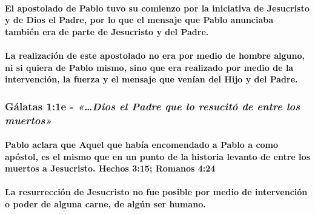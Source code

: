 \documentclass[11a pt,twoside]{article}
\newcommand{\scripture}[1]{%
  {\fontsize{12pt}{16pt}\selectfont\ScriptureFont\itshape #1}%
}
\let\oldsubsubsection\subsubsection
\renewcommand{\subsubsection}{\needspace{4\baselineskip}\oldsubsubsection}
\let\oldparagraph\paragraph
\renewcommand{\paragraph}{\needspace{3\baselineskip}\oldparagraph}
\begin{document}
\paragraph{El apostolado de Pablo tuvo su comienzo por la iniciativa de
Jesucristo y de Dios el Padre, por lo que el mensaje que Pablo anunciaba
también era de parte de Jesucristo y del
Padre.}\label{el-apostolado-de-pablo-tuvo-su-comienzo-por-la-iniciativa-de-jesucristo-y-de-dios-el-padre-por-lo-que-el-mensaje-que-pablo-anunciaba-tambiuxe9n-era-de-parte-de-jesucristo-y-del-padre.}

\paragraph{La realización de este apostolado no era por medio de hombre
alguno, ni si quiera de Pablo mismo, sino que era realizado por medio de
la intervención, la fuerza y el mensaje que venían del Hijo y del
Padre.}\label{la-realizaciuxf3n-de-este-apostolado-no-era-por-medio-de-hombre-alguno-ni-si-quiera-de-pablo-mismo-sino-que-era-realizado-por-medio-de-la-intervenciuxf3n-la-fuerza-y-el-mensaje-que-venuxedan-del-hijo-y-del-padre.}

\subsubsection{\texorpdfstring{Gálatas 1:1e -
\scripture{«…Dios el Padre que lo resucitó de entre los muertos»}}{Gálatas 1:1e - }}\label{guxe1latas-11e---dios-el-padre-que-lo-resucituxf3-de-entre-los-muertos}

\paragraph{Pablo aclara que Aquel que había encomendado a Pablo a como
apóstol, es el mismo que en un punto de la historia levanto de entre los
muertos a Jesucristo. Hechos 3:15; Romanos
4:24}\label{pablo-aclara-que-aquel-que-habuxeda-encomendado-a-pablo-a-como-apuxf3stol-es-el-mismo-que-en-un-punto-de-la-historia-levanto-de-entre-los-muertos-a-jesucristo.-hechos-315-romanos-424}

\paragraph{La resurrección de Jesucristo no fue posible por medio de
intervención o poder de alguna carne, de algún ser
humano.}\label{la-resurrecciuxf3n-de-jesucristo-no-fue-posible-por-medio-de-intervenciuxf3n-o-poder-de-alguna-carne-de-alguxfan-ser-humano.}
\end{document}
